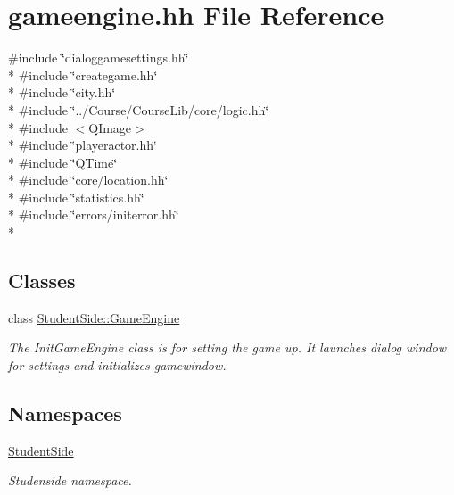 \hypertarget{gameengine_8hh}{\section{gameengine.\-hh File Reference}
\label{gameengine_8hh}
}
{\ttfamily \#include \char`\"{}dialoggamesettings.\-hh\char`\"{}}\\*
{\ttfamily \#include \char`\"{}creategame.\-hh\char`\"{}}\\*
{\ttfamily \#include \char`\"{}city.\-hh\char`\"{}}\\*
{\ttfamily \#include \char`\"{}../\-Course/\-Course\-Lib/core/logic.\-hh\char`\"{}}\\*
{\ttfamily \#include $<$Q\-Image$>$}\\*
{\ttfamily \#include \char`\"{}playeractor.\-hh\char`\"{}}\\*
{\ttfamily \#include \char`\"{}Q\-Time\char`\"{}}\\*
{\ttfamily \#include \char`\"{}core/location.\-hh\char`\"{}}\\*
{\ttfamily \#include \char`\"{}statistics.\-hh\char`\"{}}\\*
{\ttfamily \#include \char`\"{}errors/initerror.\-hh\char`\"{}}\\*
\subsection*{Classes}
\begin{DoxyCompactItemize}
\item 
class \hyperlink{class_student_side_1_1_game_engine}{Student\-Side\-::\-Game\-Engine}
\begin{DoxyCompactList}\small\item\em The Init\-Game\-Engine class is for setting the game up. It launches dialog window for settings and initializes gamewindow. \end{DoxyCompactList}\end{DoxyCompactItemize}
\subsection*{Namespaces}
\begin{DoxyCompactItemize}
\item 
\hyperlink{namespace_student_side}{Student\-Side}
\begin{DoxyCompactList}\small\item\em Studenside namespace. \end{DoxyCompactList}\end{DoxyCompactItemize}
